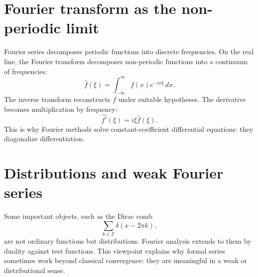 \section{Fourier transform as the non-periodic limit}

Fourier series decomposes periodic functions into discrete frequencies.  On the real line, the Fourier transform decomposes non-periodic functions into a continuum of frequencies:
\[
  \widehat f(\xi)=\int_{-\infty}^{\infty}f(x)e^{-ix\xi}\,dx.
\]
The inverse transform reconstructs $f$ under suitable hypotheses.  The derivative becomes multiplication by frequency:
\[
  \widehat{f'}(\xi)=i\xi\widehat f(\xi).
\]
This is why Fourier methods solve constant-coefficient differential equations: they diagonalize differentiation.

\section{Distributions and weak Fourier series}

Some important objects, such as the Dirac comb
\[
  \sum_{k\in\mathbb Z}\delta(x-2\pi k),
\]
are not ordinary functions but distributions.  Fourier analysis extends to them by duality against test functions.  This viewpoint explains why formal series sometimes work beyond classical convergence: they are meaningful in a weak or distributional sense.
